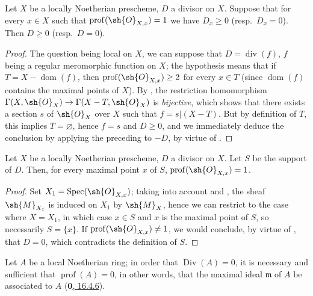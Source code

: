 \begin{proposition}[21.1.8]
\label{IV.21.1.8}
Let $X$ be a locally Noetherian prescheme, $D$ a divisor on $X$.
Suppose that for every $x\in X$ such that $\operatorname{prof}(\sh{O}_{X,x})=1$ we have $D_x\geq 0$ (resp.\ $D_x=0$).
Then $D\geq 0$ (resp.\ $D=0$).
\end{proposition}

\begin{proof}
The question being local on $X$, we can suppose that $D=\operatorname{div}(f)$, $f$ being a
regular meromorphic function on $X$;
the hypothesis means that if $T=X-\operatorname{dom}(f)$, then $\operatorname{prof}(\sh{O}_{X,x})\geq 2$ for every $x\in T$ (since $\operatorname{dom}(f)$ contains the maximal points of $X$).
By , the restriction homomorphism $\Gamma(X,\sh{O}_X)\to\Gamma(X-T,\sh{O}_X)$ is \emph{bijective}, which shows that there exists a section $s$ of $\sh{O}_X$ over $X$ such that $f=s|(X-T)$.
But by definition of $T$, this implies $T=\varnothing$, hence $f=s$ and $D\geq 0$, and we immediately deduce the conclusion by applying the preceding to $-D$, by virtue of .
\end{proof}

\begin{corollary}[21.1.9]
\label{IV.21.1.9}
Let $X$ be a locally Noetherian prescheme, $D$ a divisor on $X$.
Let $S$ be the support of $D$.
Then, for every maximal point $x$ of $S$, $\operatorname{prof}(\sh{O}_{X,x})=1$.
\end{corollary}

\begin{proof}
Set $X_1=\operatorname{Spec}(\sh{O}_{X,x})$;
taking into account  and , the sheaf $\sh{M}_{X_1}$ is induced on $X_1$ by $\sh{M}_X$, hence we can restrict to the case where $X=X_1$, in which case $x\in S$ and $x$ is the maximal point of $S$, so necessarily $S=\{x\}$.
If $\operatorname{prof}(\sh{O}_{X,x})\neq 1$, we would conclude, by virtue of , that $D=0$, which contradicts the definition of $S$.
\end{proof}

\begin{proposition}[21.1.10]
\label{IV.21.1.10}
Let $A$ be a local Noetherian ring;
in order that $\operatorname{Div}(A)=0$, it is necessary and sufficient that $\operatorname{prof}(A)=0$, in other words, that the maximal ideal $\mathfrak{m}$ of $A$ be associated to $A$
(\hyperref[0.16.4.6]{$\mathbf{0}$, 16.4.6}).
\end{proposition}

